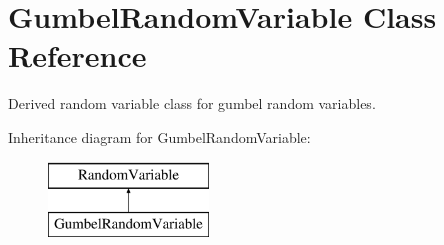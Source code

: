 \section{Gumbel\+Random\+Variable Class Reference}
\label{classPecos_1_1GumbelRandomVariable}


Derived random variable class for gumbel random variables.  


Inheritance diagram for Gumbel\+Random\+Variable\+:\begin{figure}[H]
\begin{center}
\leavevmode
\includegraphics[height=2.000000cm]{classPecos_1_1GumbelRandomVariable}
\end{center}
\end{figure}
